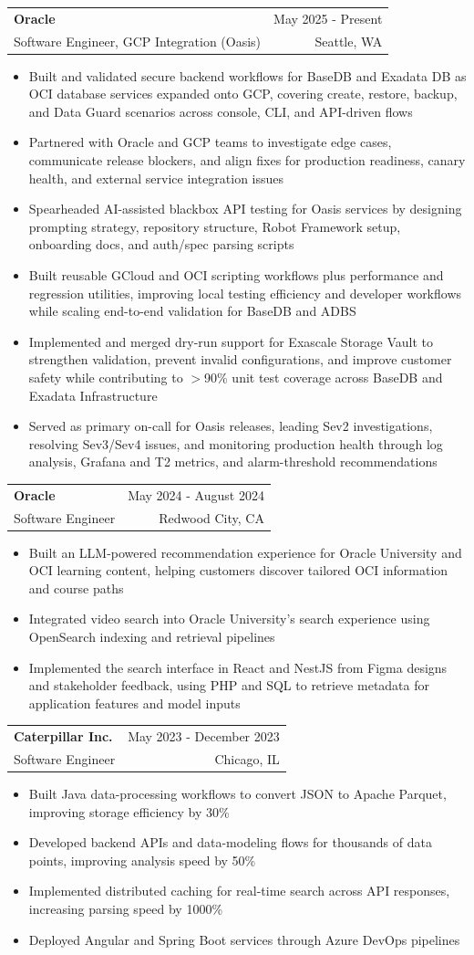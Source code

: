 \documentclass[letterpaper,11pt]{article}
\makeatletter
\newcommand{\resumeItem}[1]{
  \item\small{
    {#1 \vspace{-2pt}}
  }
}
\newcommand{\resumeSubheading}[4]{
  \vspace{-2pt}\item
    \begin{tabular*}{0.97\textwidth}[t]{l@{\extracolsep{\fill}}r}
      \textbf{#1} & #2 \\
      {\small#3} & {\small #4} \\
    \end{tabular*}\vspace{-7pt}
}
\newcommand{\resumeItemListStart}{\begin{itemize}}
\newcommand{\resumeItemListEnd}{\end{itemize}\vspace{-5pt}}
\makeatother
\begin{document}
    \resumeSubheading
  {Oracle}{May 2025 - Present}
  {Software Engineer, GCP Integration (Oasis)}{Seattle, WA}
  \resumeItemListStart
    \resumeItem{Built and validated secure backend workflows for BaseDB and Exadata DB as OCI database services expanded onto GCP, covering create, restore, backup, and Data Guard scenarios across console, CLI, and API-driven flows}
    \resumeItem{Partnered with Oracle and GCP teams to investigate edge cases, communicate release blockers, and align fixes for production readiness, canary health, and external service integration issues}
    \resumeItem{Spearheaded AI-assisted blackbox API testing for Oasis services by designing prompting strategy, repository structure, Robot Framework setup, onboarding docs, and auth/spec parsing scripts}
    \resumeItem{Built reusable GCloud and OCI scripting workflows plus performance and regression utilities, improving local testing efficiency and developer workflows while scaling end-to-end validation for BaseDB and ADBS}
    \resumeItem{Implemented and merged dry-run support for Exascale Storage Vault to strengthen validation, prevent invalid configurations, and improve customer safety while contributing to $>$90\% unit test coverage across BaseDB and Exadata Infrastructure}
    \resumeItem{Served as primary on-call for Oasis releases, leading Sev2 investigations, resolving Sev3/Sev4 issues, and monitoring production health through log analysis, Grafana and T2 metrics, and alarm-threshold recommendations}
  \resumeItemListEnd

    \resumeSubheading
      {Oracle}{May 2024 - August 2024}
      {Software Engineer}{Redwood City, CA}
      \resumeItemListStart
        \resumeItem{Built an LLM-powered recommendation experience for Oracle University and OCI learning content, helping customers discover tailored OCI information and course paths}
        \resumeItem{Integrated video search into Oracle University's search experience using OpenSearch indexing and retrieval pipelines}
        \resumeItem{Implemented the search interface in React and NestJS from Figma designs and stakeholder feedback, using PHP and SQL to retrieve metadata for application features and model inputs}
      \resumeItemListEnd

    \resumeSubheading
      {Caterpillar Inc.}{May 2023 - December 2023}
      {Software Engineer}{Chicago, IL}
      \resumeItemListStart
        \resumeItem{Built Java data-processing workflows to convert JSON to Apache Parquet, improving storage efficiency by 30\%}
        \resumeItem{Developed backend APIs and data-modeling flows for thousands of data points, improving analysis speed by 50\%}
        \resumeItem{Implemented distributed caching for real-time search across API responses, increasing parsing speed by 1000\%}
        \resumeItem{Deployed Angular and Spring Boot services through Azure DevOps pipelines}
      \resumeItemListEnd
\end{document}
